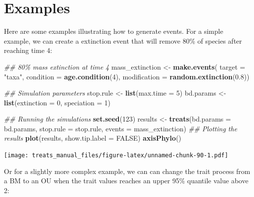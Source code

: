 \documentclass[
]{book}
\newenvironment{Shaded}{\begin{snugshade}}{\end{snugshade}}
\newcommand{\CommentTok}[1]{\textcolor[rgb]{0.56,0.35,0.01}{\textit{#1}}}
\newcommand{\DataTypeTok}[1]{\textcolor[rgb]{0.13,0.29,0.53}{#1}}
\newcommand{\DecValTok}[1]{\textcolor[rgb]{0.00,0.00,0.81}{#1}}
\newcommand{\FloatTok}[1]{\textcolor[rgb]{0.00,0.00,0.81}{#1}}
\newcommand{\KeywordTok}[1]{\textcolor[rgb]{0.13,0.29,0.53}{\textbf{#1}}}
\newcommand{\NormalTok}[1]{#1}
\newcommand{\OtherTok}[1]{\textcolor[rgb]{0.56,0.35,0.01}{#1}}
\newcommand{\StringTok}[1]{\textcolor[rgb]{0.31,0.60,0.02}{#1}}
\begin{document}
\hypertarget{examples}{%
\section{Examples}\label{examples}}

Here are some examples illustrating how to generate events.
For a simple example, we can create a extinction event that will remove 80\% of species after reaching time 4:

\begin{Shaded}
\begin{Highlighting}[]
\CommentTok{\#\# 80\% mass extinction at time 4}
\NormalTok{mass\_extinction \textless{}{-}}\StringTok{ }\KeywordTok{make.events}\NormalTok{(}
                      \DataTypeTok{target =} \StringTok{"taxa"}\NormalTok{,}
                      \DataTypeTok{condition =} \KeywordTok{age.condition}\NormalTok{(}\DecValTok{4}\NormalTok{),}
                      \DataTypeTok{modification =} \KeywordTok{random.extinction}\NormalTok{(}\FloatTok{0.8}\NormalTok{))}

\CommentTok{\#\# Simulation parameters}
\NormalTok{stop.rule \textless{}{-}}\StringTok{ }\KeywordTok{list}\NormalTok{(}\DataTypeTok{max.time =} \DecValTok{5}\NormalTok{)}
\NormalTok{bd.params \textless{}{-}}\StringTok{ }\KeywordTok{list}\NormalTok{(}\DataTypeTok{extinction =} \DecValTok{0}\NormalTok{, }\DataTypeTok{speciation =} \DecValTok{1}\NormalTok{)}

\CommentTok{\#\# Running the simulations}
\KeywordTok{set.seed}\NormalTok{(}\DecValTok{123}\NormalTok{)}
\NormalTok{results \textless{}{-}}\StringTok{ }\KeywordTok{treats}\NormalTok{(}\DataTypeTok{bd.params =}\NormalTok{ bd.params,}
                \DataTypeTok{stop.rule =}\NormalTok{ stop.rule,}
                \DataTypeTok{events =}\NormalTok{ mass\_extinction)}
\CommentTok{\#\# Plotting the results}
\KeywordTok{plot}\NormalTok{(results, }\DataTypeTok{show.tip.label =} \OtherTok{FALSE}\NormalTok{)}
\KeywordTok{axisPhylo}\NormalTok{()}
\end{Highlighting}
\end{Shaded}

\texttt{[image: treats\_manual\_files/figure-latex/unnamed-chunk-90-1.pdf]}

Or for a slightly more complex example, we can can change the trait process from a BM to an OU when the trait values reaches an upper 95\% quantile value above 2:
\end{document}
